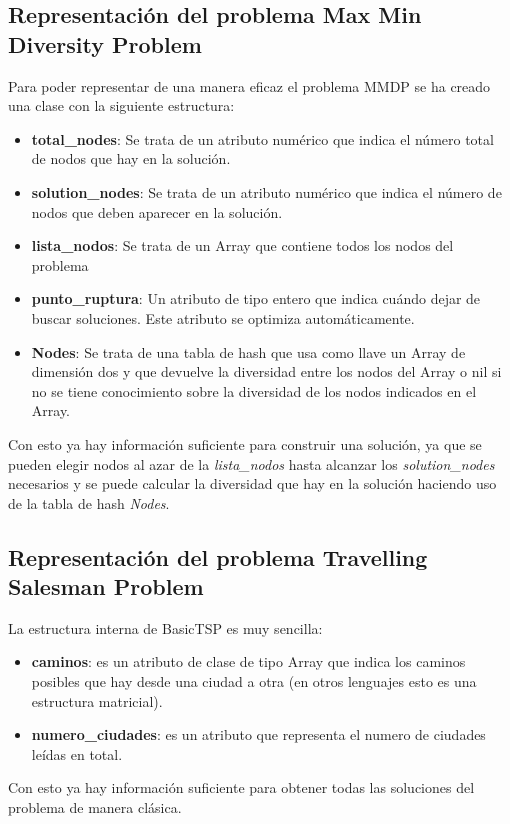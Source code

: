 \documentclass[12pt,a4paper,draft,openany]{article}
\begin{document}
\subsection{Representación del problema Max Min Diversity Problem}
Para poder representar de una manera eficaz el problema MMDP se ha creado una clase con
la siguiente estructura:

\begin{itemize}
\item \textbf{total\_nodes}: Se trata de un atributo numérico que indica el número total de nodos que hay en la solución.
\item \textbf{solution\_nodes}: Se trata de un atributo numérico que indica el número de nodos que deben aparecer en la solución.
\item \textbf{lista\_nodos}: Se trata de un Array que contiene todos los nodos del problema
\item \textbf{punto\_ruptura}: Un atributo de tipo entero que indica cuándo dejar de buscar soluciones. Este atributo se optimiza automáticamente.
\item \textbf{Nodes}: Se trata de una tabla de hash que usa como llave un Array de dimensión dos y que devuelve la diversidad entre los nodos del Array o nil si no se tiene conocimiento sobre la diversidad de los nodos indicados en el Array.
\end{itemize}

Con esto ya hay información suficiente para construir una solución, ya que se pueden elegir nodos al azar de la \emph{lista\_nodos} hasta alcanzar los \emph{solution\_nodes} necesarios y se puede calcular la diversidad que hay en la solución haciendo uso de la tabla de hash \emph{Nodes}.

\subsection{Representación del problema Travelling Salesman Problem}
La estructura interna de BasicTSP es muy sencilla:
\begin{itemize}
\item \textbf{caminos}: es un atributo de clase de tipo Array que indica los caminos posibles
que hay desde una ciudad a otra (en otros lenguajes esto es una estructura matricial).
\item \textbf{numero\_ciudades}: es un atributo que representa el numero de ciudades leídas en total.
\end{itemize}

Con esto ya hay información suficiente para obtener todas las soluciones del problema de manera clásica.
\end{document}
